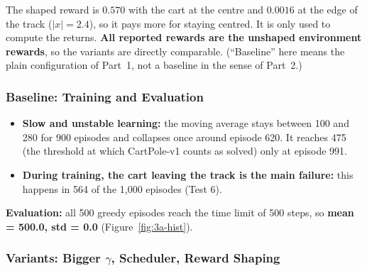 The shaped reward is $0.570$ with the cart at the centre and $0.0016$ at the edge of the track ($|x| = 2.4$), so it pays more for staying centred. It is only used to compute the returns. \textbf{All reported rewards are the unshaped environment rewards}, so the variants are directly comparable. (``Baseline'' here means the plain configuration of Part~1, not a baseline in the sense of Part~2.)

\subsubsection{Baseline: Training and Evaluation}


\begin{itemize}
  \item \textbf{Slow and unstable learning:} the moving average stays between 100 and 280 for 900 episodes and collapses once around episode 620. It reaches 475 (the threshold at which CartPole-v1 counts as solved) only at episode 991.
  \item \textbf{During training, the cart leaving the track is the main failure:} this happens in 564 of the 1,000 episodes (Test 6).
\end{itemize}


\textbf{Evaluation:} all 500 greedy episodes reach the time limit of 500 steps, so \textbf{mean = 500.0, std = 0.0} (Figure~\ref{fig:3a-hist}).

\subsubsection{\texorpdfstring{Variants: Bigger $\gamma$, Scheduler, Reward Shaping}{Variants: Bigger gamma, Scheduler, Reward Shaping}}




